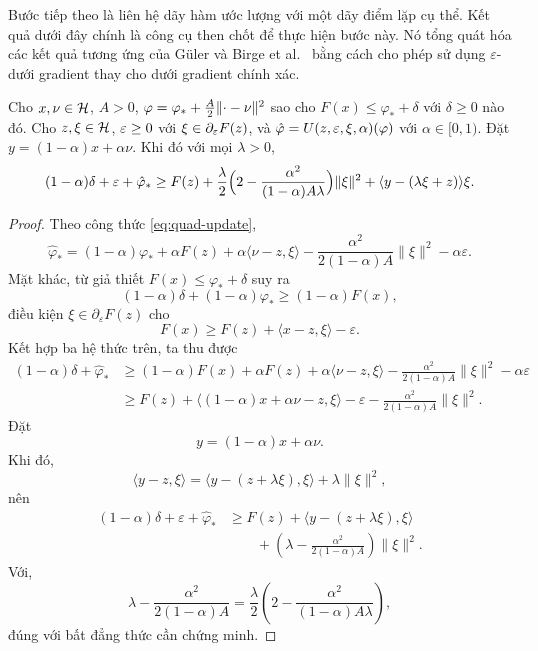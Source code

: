 \begin{essayonly}
Bước tiếp theo là liên hệ dãy hàm ước lượng với một dãy điểm lặp cụ thể. Kết quả dưới đây chính là công cụ then chốt để thực hiện bước này. Nó tổng quát hóa các kết quả tương ứng của Güler \citep{guler1992} và Birge et al.~\citep{birge1998} bằng cách cho phép sử dụng $\varepsilon$-dưới gradient thay cho dưới gradient chính xác.
\end{essayonly}

\begin{lemma}
\label{lem:core}
Cho $x,\nu\in\mathcal{H}$, $A>0$, $\varphi=\varphi_*+\tfrac A2\lVert\cdot-\nu\rVert^2$
sao cho $F(x)\le\varphi_*+\delta$ với $\delta\ge0$ nào đó. Cho
$z,\xi\in\mathcal{H}$, $\varepsilon\ge0$ với $\xi\in\partial_\varepsilon F(z)$, và
$\hat\varphi=U(z,\varepsilon,\xi,\alpha)(\varphi)$ với $\alpha\in[0,1)$. Đặt
$y=(1-\alpha)x+\alpha\nu$. Khi đó với mọi $\lambda>0$,
\[
  (1-\alpha)\delta + \varepsilon + \hat\varphi_*
  \ge F(z) + \frac\lambda2\Big(2-\frac{\alpha^2}{(1-\alpha)A\lambda}\Big)\lVert\xi\rVert^2
  + \langle y-(\lambda\xi+z)\rangle{\xi}.
\]
\end{lemma}
\begin{essayonly}
\begin{proof}
Theo công thức \eqref{eq:quad-update},
\[
\hat\varphi_*
=
(1-\alpha)\varphi_*
+\alpha F(z)
+\alpha\langle\nu-z,\xi\rangle
-\frac{\alpha^2}{2(1-\alpha)A}\|\xi\|^2
-\alpha\varepsilon.
\]
Mặt khác, từ giả thiết $F(x)\le\varphi_*+\delta$ suy ra
\[
(1-\alpha)\delta+(1-\alpha)\varphi_*
\ge
(1-\alpha)F(x),
\]
điều kiện $\xi\in\partial_\varepsilon F(z)$ cho
\[
F(x)\ge
F(z)+\langle x-z,\xi\rangle-\varepsilon.
\]
Kết hợp ba hệ thức trên, ta thu được
\[
\begin{aligned}
(1-\alpha)\delta+\hat\varphi_*
&\ge
(1-\alpha)F(x)
+\alpha F(z)
+\alpha\langle\nu-z,\xi\rangle
-\frac{\alpha^2}{2(1-\alpha)A}\|\xi\|^2
-\alpha\varepsilon\\
&\ge
F(z)
+\bigl\langle (1-\alpha)x+\alpha\nu-z,\xi\bigr\rangle
-\varepsilon
-\frac{\alpha^2}{2(1-\alpha)A}\|\xi\|^2.
\end{aligned}
\]
Đặt
\[
y=(1-\alpha)x+\alpha\nu.
\]
Khi đó,
\[
\langle y-z,\xi\rangle
=
\langle y-(z+\lambda\xi),\xi\rangle
+\lambda\|\xi\|^2,
\]
nên
\[
\begin{aligned}
(1-\alpha)\delta+\varepsilon+\hat\varphi_*
&\ge
F(z)
+\langle y-(z+\lambda\xi),\xi\rangle\\
&\qquad
+\left(
\lambda-\frac{\alpha^2}{2(1-\alpha)A}
\right)\|\xi\|^2.
\end{aligned}
\]
Với,
\[
\lambda-\frac{\alpha^2}{2(1-\alpha)A}
=
\frac{\lambda}{2}
\left(
2-\frac{\alpha^2}{(1-\alpha)A\lambda}
\right),
\]
đúng với bất đẳng thức cần chứng minh.
\end{proof}
\end{essayonly}

